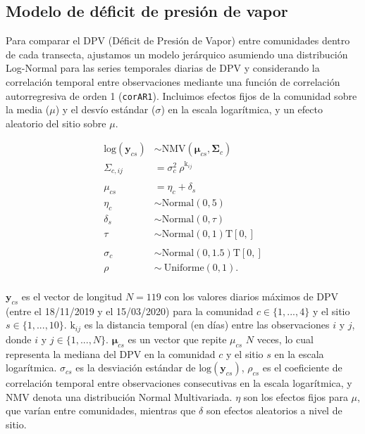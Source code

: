 \subsection{Modelo de déficit de presión de vapor}\label{append:microclimate-models}

Para comparar el DPV (Déficit de Presión de Vapor) entre comunidades dentro de cada transecta, ajustamos un modelo jerárquico asumiendo una distribución Log-Normal para las series temporales diarias de DPV y considerando la correlación temporal entre observaciones mediante una función de correlación autorregresiva de orden 1 (\texttt{corAR1}). Incluimos efectos fijos de la comunidad sobre la media ($\mu$) y el desvío estándar ($\sigma$) en la escala logarítmica, y un efecto aleatorio del sitio sobre $\mu$. 

\begin{equation}
    \begin{aligned}
    \text{log}(\textbf{y}_{cs}) &\sim \text{NMV}(\boldsymbol{\mu}_{cs}, \boldsymbol{\Sigma}_{c}) \\
    \Sigma_{c,ij} &= \sigma_{c}^{2} \ \rho^{\text{k}_{ij}} \\
    \\
    \mu_{cs} &= \eta_{c} + \delta_{s} \\
    \eta_{c} &\sim \text{Normal}(0, 5) \\
    \delta_{s} &\sim \text{Normal}(0, \tau) \\
    \tau &\sim \text{Normal}(0, 1)\text{T}[0, ] \\
    \\
    \sigma_{c} &\sim \text{Normal}(0, 1.5)\text{T}[0, ] \\
    \rho &\sim \ \text{Uniforme}(0, 1). \\
    \end{aligned}
\end{equation}
  
\noindent $\textbf{y}_{cs}$ es el vector de longitud $N = 119$ con los valores diarios máximos de DPV (entre el 18/11/2019 y el 15/03/2020) para la comunidad $c \in \{1, ..., 4\}$ y el sitio $s \in \{1, ..., 10\}$. $\text{k}_{ij}$ es la distancia temporal (en días) entre las observaciones $i$ y $j$, donde $i$ y $j \in \{1, ..., N\}$.  
$\boldsymbol{\mu}_{cs}$ es un vector que repite $\mu_{cs}$ $N$ veces, lo cual representa la mediana del DPV en la comunidad $c$ y el sitio $s$ en la escala logarítmica.  
$\sigma_{cs}$ es la desviación estándar de $\text{log}(\textbf{y}_{cs})$,  
$\rho_{cs}$ es el coeficiente de correlación temporal entre observaciones consecutivas en la escala logarítmica,  
y NMV denota una distribución Normal Multivariada.  
$\eta$ son los efectos fijos para $\mu$, que varían entre comunidades, mientras que $\delta$ son efectos aleatorios a nivel de sitio. 
  
